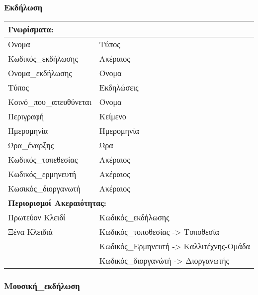 \subsubsection*{Εκδήλωση}

\begin{tabular}{|p{6cm}|p{8cm}|}
  \multicolumn{2}{l}{\textbf{Γνωρίσματα:}}                         \\ \hline
  Όνομα                   & Τύπος                                  \\ \hline
  Κωδικός\_εκδήλωσης      & Ακέραιος                               \\ \hline
  Όνομα\_εκδήλωσης        & Όνομα                                  \\ \hline
  Τύπος                   & Εκδηλώσεις                             \\ \hline
  Κοινό\_που\_απευθύνεται & Όνομα                                  \\ \hline
  Περιγραφή               & Κείμενο                                \\ \hline
  Ημερομηνία              & Ημερομηνία                             \\ \hline
  Ώρα\_έναρξης            & Ώρα                                    \\ \hline
  Κωδικός\_τοπεθεσίας     & Ακέραιος                               \\ \hline
  Κωδικός\_ερμηνευτή      & Ακέραιος                               \\ \hline
  Κωσικός\_διοργανωτή     & Ακέραιος                               \\ \hline
  \multicolumn{2}{l}{\textbf{Περιορισμοί Ακεραιότητας:}}           \\ \hline
  Πρωτεύον Κλειδί         & Κωδικός\_εκδήλωσης                     \\ \hline
  Ξένα Κλειδιά            & Κωδικός\_τοποθεσίας -> Τοποθεσία       \\ \cline{2-2}
                          & Κωδικός\_Ερμηνευτή -> Καλλιτέχνης-Ομάδα \\ \cline{2-2}
                          & Κωδικός\_διοργανώτή -> Διοργανωτής     \\ \hline
\end{tabular}

\subsubsection*{Μουσική\_εκδήλωση}

